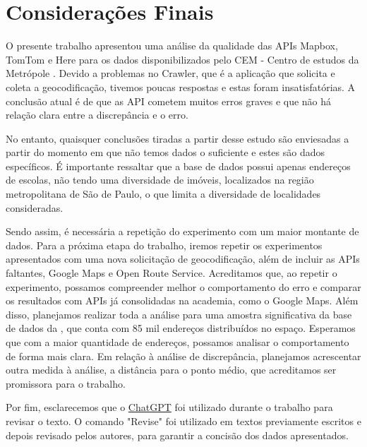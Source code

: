 \chapter{Considerações Finais} \label{consideracoes}

O presente trabalho apresentou uma análise da qualidade das APIs Mapbox, TomTom e Here para os dados disponibilizados pelo CEM - Centro de estudos da Metrópole \cite{cem}. Devido a problemas no Crawler, que é a aplicação que solicita e coleta a geocodificação, tivemos poucas respostas e estas foram insatisfatórias. A conclusão atual é de que as API cometem muitos erros graves e que não há relação clara entre a discrepância e o erro. 

No entanto, quaisquer conclusões tiradas a partir desse estudo são enviesadas a partir do momento em que não temos dados o suficiente e estes são dados específicos. É importante ressaltar que a base de dados possui apenas endereços de escolas, não tendo uma diversidade de imóveis, localizados na região metropolitana de São de Paulo, o que limita a diversidade de localidades consideradas.

Sendo assim, é necessária a repetição do experimento com um maior montante de dados. Para a próxima etapa do trabalho, iremos repetir os experimentos apresentados com uma nova solicitação de geocodificação, além de incluir as APIs faltantes, Google Maps e Open Route Service. Acreditamos que, ao repetir o experimento, possamos compreender melhor o comportamento do erro e comparar os resultados com APIs já consolidadas na academia, como o Google Maps. Além disso, planejamos realizar toda a análise para uma amostra significativa da base de dados da \cite{prodabel}, que conta com 85 mil endereços distribuídos no espaço. Esperamos que com a maior quantidade de endereços, possamos analisar o comportamento de forma mais clara. Em relação à análise de discrepância, planejamos acrescentar outra medida à análise, a distância para o ponto médio, que acreditamos ser promissora para o trabalho.

Por fim, esclarecemos que o \href{https://chat.openai.com/auth/login?next=%2F}{ChatGPT} foi utilizado durante o trabalho para revisar o texto. O comando "Revise" foi utilizado em textos previamente escritos e depois revisado pelos autores, para garantir a concisão dos dados apresentados. 
 